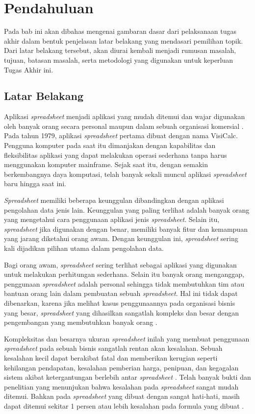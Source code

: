 \chapter{Pendahuluan}

Pada bab ini akan dibahas mengenai gambaran dasar dari pelaksanaan tugas akhir dalam bentuk penjelasan latar belakang yang mendasari pemilihan topik. Dari latar belakang tersebut, akan diurai kembali menjadi rumusan masalah, tujuan, batasan masalah, serta metodologi yang digunakan untuk keperluan Tugas Akhir ini.

\section{Latar Belakang}

Aplikasi \textit{spreadsheet} menjadi aplikasi yang mudah ditemui dan wajar digunakan oleh banyak orang secara personal maupun dalam sebuah organisasi komersial \citep{Chan1996}. Pada tahun 1979, aplikasi \textit{spreadsheet} pertama dibuat dengan nama VisiCalc. Pengguna komputer pada saat itu dimanjakan dengan kapabilitas dan fleksibilitas aplikasi yang dapat melakukan operasi sederhana tanpa harus menggunakan komputer mainframe. Sejak saat itu, dengan semakin berkembangnya daya komputasi, telah banyak sekali muncul aplikasi \textit{spreadsheet} baru hingga saat ini.

\textit{Spreadsheet} memiliki beberapa keunggulan dibandingkan dengan aplikasi pengolahan data jenis lain. Keunggulan yang paling terlihat adalah banyak orang yang mengetahui cara penggunaan aplikasi jenis \textit{spreadsheet}. Selain itu, \textit{spreadsheet} jika digunakan dengan benar, memiliki banyak fitur dan kemampuan yang jarang diketahui orang awam. Dengan keunggulan ini, \textit{spreadsheet} sering kali dijadikan pilihan utama dalam pengolahan data.

Bagi orang awam, \textit{spreadsheet} sering terlihat sebagai aplikasi yang digunakan untuk melakukan perhitungan sederhana. Selain itu banyak orang menganggap, penggunaan \textit{spreadsheet} adalah personal sehingga tidak membutuhkan tim atau bantuan orang lain dalam pembuatan sebuah \textit{spreadsheet}. Hal ini tidak dapat dibenarkan, karena jika melihat kasus penggunaannya pada organisasi bisnis yang besar, \textit{spreadsheet} yang dihasilkan sangatlah kompleks dan besar dengan pengembangan yang membutuhkan banyak orang \citep{Panko1998}.

Kompleksitas dan besarnya ukuran \textit{spreadsheet} inilah yang membuat penggunaan \textit{spreadsheet} pada sebuah bisnis sangatlah rentan akan kesalahan. Sebuah kesalahan kecil dapat berakibat fatal dan memberikan kerugian seperti kehilangan pendapatan, kesalahan pemberian harga, penipuan, dan kegagalan sistem akibat ketergantungan berlebih antar \textit{spreadsheet} \citep{EUSPRIGAbout}. Telah banyak bukti dan penelitian yang menunjukan bahwa kesalahan pada \textit{spreadsheet} sangat mudah ditemui. Bahkan pada \textit{spreadsheet} yang dibuat dengan sangat hati-hati, masih dapat ditemui sekitar 1 persen atau lebih kesalahan pada formula yang dibuat \citep{Panko1998}.

